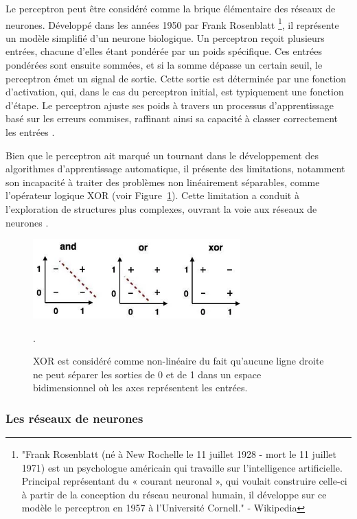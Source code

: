 Le perceptron peut être considéré comme la brique élémentaire des réseaux de neurones. Développé dans les années 1950 par Frank Rosenblatt \footnote{"Frank Rosenblatt (né à New Rochelle le 11 juillet 1928 - mort le 11 juillet 1971) est un psychologue américain qui travaille sur l'intelligence artificielle. Principal représentant du « courant neuronal », qui voulait construire celle-ci à partir de la conception du réseau neuronal humain, il développe sur ce modèle le perceptron en 1957 à l'Université Cornell." - Wikipedia}, il représente un modèle simplifié d'un neurone biologique. Un perceptron reçoit plusieurs entrées, chacune d'elles étant pondérée par un poids spécifique. Ces entrées pondérées sont ensuite sommées, et si la somme dépasse un certain seuil, le perceptron émet un signal de sortie. Cette sortie est déterminée par une fonction d'activation, qui, dans le cas du perceptron initial, est typiquement une fonction d'étape. Le perceptron ajuste ses poids à travers un processus d'apprentissage basé sur les erreurs commises, raffinant ainsi sa capacité à classer correctement les entrées \cite{wang2017origin}.

Bien que le perceptron ait marqué un tournant dans le développement des algorithmes d'apprentissage automatique, il présente des limitations, notamment son incapacité à traiter des problèmes non linéairement séparables, comme l'opérateur logique XOR (voir Figure~\ref{fig:perceptron-xor}). Cette limitation a conduit à l'exploration de structures plus complexes, ouvrant la voie aux réseaux de neurones  \cite{Min69}.

\begin{figure}[H]
    \centering
    \includegraphics[width=8cm]{gfx/fig-perceptron-xor.png}
    \caption{XOR est considéré comme non-linéaire du fait qu'aucune ligne droite ne peut séparer les sorties de 0 et de 1 dans un espace bidimensionnel où les axes représentent les entrées. \cite{Jaspreet_2022}}.
    \label{fig:perceptron-xor}
\end{figure}

\subsubsection{Les réseaux de neurones}

